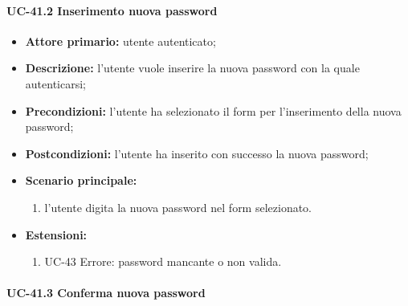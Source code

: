 \paragraph{UC-41.2 Inserimento nuova password}
	\begin{itemize}
		\item \textbf{Attore primario:} utente autenticato;

		\item \textbf{Descrizione:} l'utente vuole inserire la nuova password con la quale autenticarsi;

		\item \textbf{Precondizioni:} l'utente ha selezionato il form per l'inserimento della nuova password;

		\item \textbf{Postcondizioni:} l'utente ha inserito con successo la nuova password;

		\item \textbf{Scenario principale:}
	  		\begin{enumerate}
		  		\item l'utente digita la nuova password nel form selezionato.
	  		\end{enumerate}
	  	\item \textbf{Estensioni:}
	  		\begin{enumerate}
		  		\item UC-43 Errore: password mancante o non valida.
	  		\end{enumerate}
	\end{itemize}


\paragraph{UC-41.3 Conferma nuova password}

